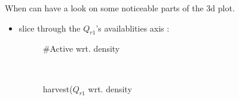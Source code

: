\documentclass[a4paper,10pt]{article}
\begin{document}
When can have a look on some noticeable parts of the 3d plot. 

\begin{itemize}
\item slice through the $Q_{r1}$'s availablities axis : 
\begin{figure}[H]
\caption{\#Active wrt. density }
\caption{harvest($Q_{r1}$ wrt. density }
\\

\end{figure}
\end{itemize}
\end{document}
